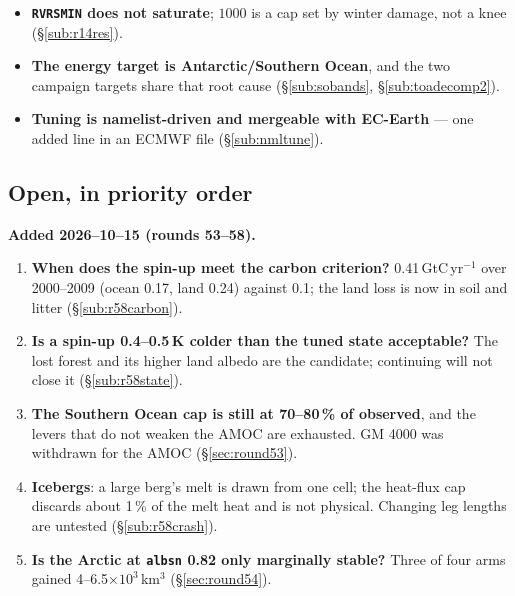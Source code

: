 \documentclass[10pt]{article}
\begin{document}
\begin{itemize}
  $+0.0074$ is snow and $+0.0080$ the snow-free surface; every forest type is inside $+0.006$
  once snow is masked per cell per month (\S\ref{sub:snowtile}).
\item \textbf{\texttt{RVRSMIN} does not saturate}; $1000$ is a cap set by winter damage, not a
  knee (\S\ref{sub:r14res}).
\item \textbf{The energy target is Antarctic/Southern Ocean}, and the two campaign targets
  share that root cause (\S\ref{sub:sobands}, \S\ref{sub:toadecomp2}).
\item \textbf{Tuning is namelist-driven and mergeable with EC-Earth} --- one added line in an
  ECMWF file (\S\ref{sub:nmltune}).
\end{itemize}

\subsection{Open, in priority order}\label{sub:open}
\textbf{Added 2026--10--15 (rounds 53--58).}
\begin{enumerate}\itemsep2pt
\item \textbf{When does the spin-up meet the carbon criterion?} 0.41\,GtC\,yr$^{-1}$ over 2000--2009
(ocean 0.17, land 0.24) against 0.1; the land loss is now in soil and litter (\S\ref{sub:r58carbon}).
\item \textbf{Is a spin-up 0.4--0.5\,K colder than the tuned state acceptable?} The lost forest and its
higher land albedo are the candidate; continuing will not close it (\S\ref{sub:r58state}).
\item \textbf{The Southern Ocean cap is still at 70--80\,\% of observed}, and the levers that do not
weaken the AMOC are exhausted. GM 4000 was withdrawn for the AMOC (\S\ref{sec:round53}).
\item \textbf{Icebergs}: a large berg's melt is drawn from one cell; the heat-flux cap discards about
1\,\% of the melt heat and is not physical. Changing leg lengths are untested (\S\ref{sub:r58crash}).
\item \textbf{Is the Arctic at \texttt{albsn} 0.82 only marginally stable?} Three of four arms gained
4--6.5$\times10^3$\,km$^3$ (\S\ref{sec:round54}).
\end{enumerate}
\end{document}
